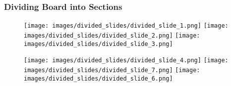 \begin{frame}
  \frametitle{Dividing Board into Sections}

  \begin{figure}
    \texttt{[image: images/divided\_slides/divided\_slide\_1.png]}
    \qquad
    \texttt{[image: images/divided\_slides/divided\_slide\_2.png]}
    \qquad
    \texttt{[image: images/divided\_slides/divided\_slide\_3.png]}
  \end{figure}

  \begin{figure}
    \texttt{[image: images/divided\_slides/divided\_slide\_4.png]}
    \qquad
    \texttt{[image: images/divided\_slides/divided\_slide\_7.png]}
    \qquad
    \texttt{[image: images/divided\_slides/divided\_slide\_6.png]}
  \end{figure}

\end{frame}
